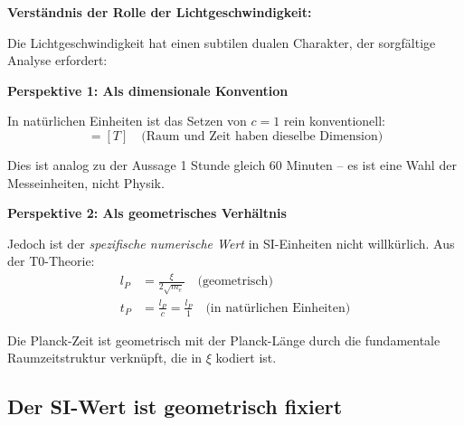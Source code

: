 \documentclass[12pt,a4paper]{article}
\begin{document}
	\begin{derivation}
		\textbf{Verst{\"a}ndnis der Rolle der Lichtgeschwindigkeit:}
		
		Die Lichtgeschwindigkeit hat einen subtilen dualen Charakter, der sorgf{\"a}ltige Analyse erfordert:
		
		\textbf{Perspektive 1: Als dimensionale Konvention}
		
		In nat{\"u}rlichen Einheiten ist das Setzen von $c = 1$ rein konventionell:
		\begin{equation}
			[L] = [T] \quad \text{(Raum und Zeit haben dieselbe Dimension)}
		\end{equation}
		
		Dies ist analog zu der Aussage 1 Stunde gleich 60 Minuten -- es ist eine Wahl der Messeinheiten, nicht Physik.
		
		\textbf{Perspektive 2: Als geometrisches Verh{\"a}ltnis}
		
		Jedoch ist der \emph{spezifische numerische Wert} in SI-Einheiten nicht willk{\"u}rlich. Aus der T0-Theorie:
		\begin{align}
			l_P &= \frac{\xi}{2\sqrt{m_e}} \quad \text{(geometrisch)} \\
			t_P &= \frac{l_P}{c} = \frac{l_P}{1} \quad \text{(in nat{\"u}rlichen Einheiten)}
		\end{align}
		
		Die Planck-Zeit ist geometrisch mit der Planck-L{\"a}nge durch die fundamentale Raumzeitstruktur verkn{\"u}pft, die in $\xi$ kodiert ist.
	\end{derivation}
	
	\subsection{Der SI-Wert ist geometrisch fixiert}
	
\end{document}

